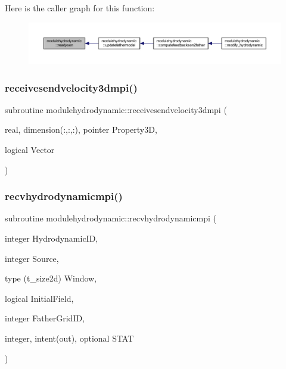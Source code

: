 Here is the caller graph for this function\+:\nopagebreak
\begin{figure}[H]
\begin{center}
\leavevmode
\includegraphics[width=350pt]{namespacemodulehydrodynamic_a89980d9805db3770c7583bdefe7730fa_icgraph}
\end{center}
\end{figure}
\mbox{\label{namespacemodulehydrodynamic_a60fe8dcc9369b6f2caa9b97647a7f605}} 
\subsubsection{\texorpdfstring{receivesendvelocity3dmpi()}{receivesendvelocity3dmpi()}}
{\footnotesize\ttfamily subroutine modulehydrodynamic\+::receivesendvelocity3dmpi (\begin{DoxyParamCaption}\item[{real, dimension(\+:,\+:,\+:), pointer}]{Property3D,  }\item[{logical}]{Vector }\end{DoxyParamCaption})\hspace{0.3cm}{\ttfamily [private]}}

\mbox{\label{namespacemodulehydrodynamic_a7093ab7e0b48d35daf4c523567c57d5a}} 
\subsubsection{\texorpdfstring{recvhydrodynamicmpi()}{recvhydrodynamicmpi()}}
{\footnotesize\ttfamily subroutine modulehydrodynamic\+::recvhydrodynamicmpi (\begin{DoxyParamCaption}\item[{integer}]{Hydrodynamic\+ID,  }\item[{integer}]{Source,  }\item[{type (t\+\_\+size2d)}]{Window,  }\item[{logical}]{Initial\+Field,  }\item[{integer}]{Father\+Grid\+ID,  }\item[{integer, intent(out), optional}]{S\+T\+AT }\end{DoxyParamCaption})\hspace{0.3cm}{\ttfamily [private]}}

